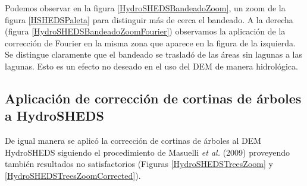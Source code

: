 \documentclass[10pt,a4paper, twoside]{report}
\begin{document}
Podemos observar en la figura \ref{HydroSHEDSBandeadoZoom}, un zoom de la figura \ref{HSHEDSPaleta} para distinguir más de cerca el bandeado. A la derecha (figura \ref{HydroSHEDSBandeadoZoomFourier}) observamos la aplicación de la corrección de Fourier en la misma zona que aparece en la figura de la izquierda. Se distingue claramente que el bandeado se trasladó de las áreas sin lagunas a las lagunas. Esto es un efecto no deseado en el uso del DEM de manera hidrológica.



\subsection{Aplicación de corrección de cortinas de árboles a HydroSHEDS}

De igual manera se aplicó la corrección de cortinas de árboles al DEM HydroSHEDS siguiendo el procedimiento de Masuelli \textit{et al.} (2009) proveyendo también resultados no satisfactorios (Figuras \ref{HydroSHEDSTreesZoom} y \ref{HydroSHEDSTreesZoomCorrected}).
\end{document}
